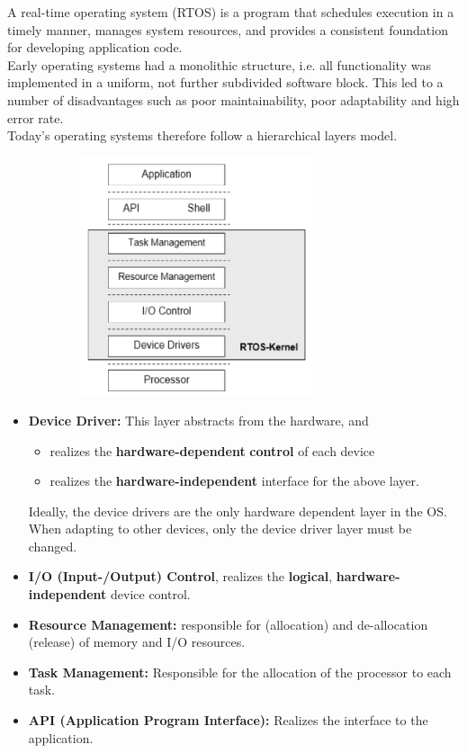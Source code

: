 A real-time operating system (RTOS) is a program that schedules execution in a timely manner, manages system resources, and provides a consistent foundation for developing application code.\\

Early operating systems had a monolithic structure, i.e. all functionality was implemented in a uniform, not further subdivided software block. This led to a number of disadvantages such as poor maintainability, poor adaptability and high error rate.\\

Today's operating systems therefore follow a hierarchical layers model. 

	\begin{figure}[h]
    \centering
    \includegraphics[width=9cm, height=7cm]{Images/image79.png}
    \label{fig:Fig }
    \end{figure}

\begin{itemize}
	\item  \textbf{Device Driver: } This layer abstracts from the hardware, and
	\begin{itemize}
		\item realizes the \textbf{hardware-dependent} \textbf{control} of each device
		\item realizes the \textbf{hardware-independent} interface for the above layer. 
	\end{itemize}

		Ideally, the device drivers are the only hardware dependent layer in the OS. When adapting to other devices, only the device driver layer must be changed.
	\item  \textbf{I/O (Input-/Output) Control}, realizes the \textbf{logical}, \textbf{hardware-independent} device control. 
	\item  \textbf{Resource Management: } responsible for (allocation) and de-allocation (release) of memory and I/O resources.
	\item  \textbf{Task Management: } Responsible for the allocation of the processor to each task. 
	\item  \textbf{API (Application Program Interface): } Realizes the interface to the application.
\end{itemize}

